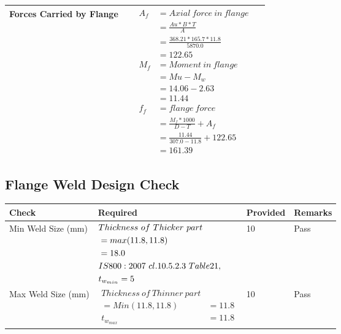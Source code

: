 \documentclass{article}%
\begin{document}
\begin{longtable}{|p{4cm}|p{5cm}|p{5.5cm}|p{1.5cm}|}
\hline%
Forces Carried by Flange&&$\begin{aligned} A_f&= Axial~force~ in ~flange  \\ &= \frac{Au * B *T}{A} \\ &= \frac{368.21 * 165.7*11.8}{5870.0} \\ &=122.65\\ M_f& =Moment~ in~ flange \\  & = Mu-M_w\\ &= 14.06-2.63\\ &=11.44\\  f_f& =flange~force  \\ & = \frac{M_f *1000}{D-T} + A_f \\ &= \frac{11.44}{307.0-11.8} +122.65 \\ &=161.39\end{aligned}$&\\%
\hline%
\end{longtable}

%
\subsection{Flange Weld  Design Check }%
\label{subsec:FlangeWeldDesignCheck}%
\renewcommand{\arraystretch}{1.2}%
\begin{longtable}{|p{4cm}|p{6cm}|p{5.5cm}|p{1.5cm}|}%
\hline%
\rowcolor{OsdagGreen}%
Check&Required&Provided&Remarks\\%
\hline%
\endhead%
\hline%
Min Weld Size (mm)&$\begin{aligned} &Thickness~of~Thicker~part\\ \noindent &=max(11.8,11.8)\\ &=18.0\\ &IS800:2007~cl.10.5.2.3~Table 21,\\  &t_{w_{min}}=5\end{aligned}$&10&Pass\\%
\hline%
Max Weld Size (mm)&$\begin{aligned} Thickness~of~Thinner~part&\\ =Min(11.8,11.8)&=11.8\\ t_{w_{max}} &=11.8\end{aligned}$&10&Pass\\%
\hline%
\end{longtable}

%
\end{document}
